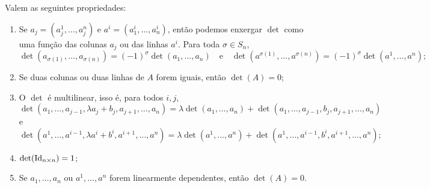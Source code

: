 \begin{theorem}
    Valem as seguintes propriedades:
    \begin{enumerate}
        \item Se $a_j = (a^1_j, \dots, a^n_j)$ e $a^i = (a^i_1, \dots, a^i_n)$, então podemos enxergar $\det$ como uma função das colunas $a_j$ ou das linhas $a^i$. Para toda $\sigma \in S_n$, \begin{equation}
            \det(a_{\sigma(1)}, \dots, a_{\sigma(n)}) = (-1)^\sigma \det(a_1, \dots, a_n) \quad \text{e} \quad \det(a^{\sigma(1)}, \dots, a^{\sigma(n)}) = (-1)^\sigma \det(a^1, \dots, a^n);
        \end{equation}
        \item Se duas colunas ou duas linhas de $A$ forem iguais, então $\det(A) = 0$;
        \item O $\det$ é multilinear, isso é, para todos $i, j$, \begin{equation}
            \det(a_1, \dots, a_{j-1}, \lambda a_j + b_j, a_{j + 1}, \dots, a_n) = \lambda \det(a_1, \dots, a_n) + \det(a_1, \dots, a_{j-1}, b_j, a_{j+1}, \dots, a_n)
        \end{equation} e \begin{equation}
            \det(a^1, \dots, a^{i-1}, \lambda a^i + b^i, a^{i + 1}, \dots, a^n) = \lambda \det(a^1, \dots, a^n) + \det(a^1, \dots, a^{i-1}, b^i, a^{i+1}, \dots, a^n);
        \end{equation}
        \item $\det(\operatorname{Id}_{n \times n}) = 1$;
        \item Se $a_1, \dots, a_n$ ou $a^1, \dots, a^n$ forem linearmente dependentes, então $\det(A) = 0$.
    \end{enumerate}
\end{theorem}
